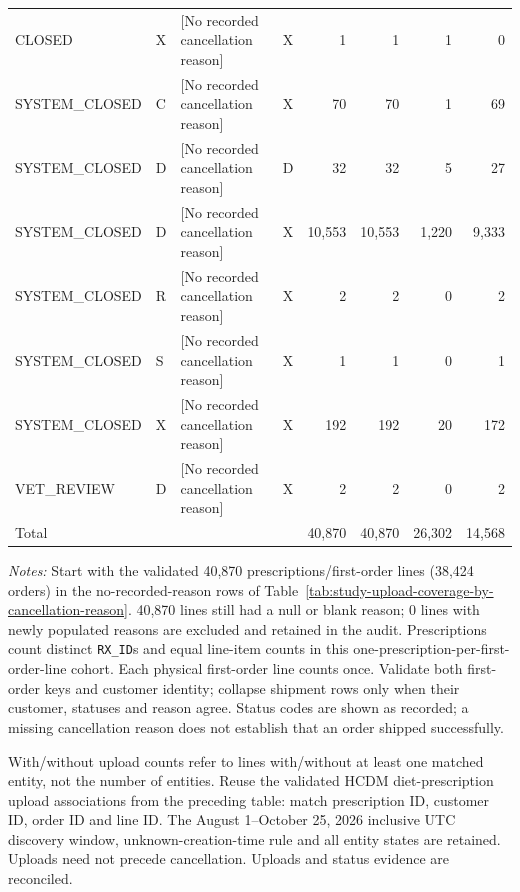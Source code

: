 \begin{landscape}
\begin{table}[htbp]
\begin{tabular}{llllrrrr}
CLOSED & X & [No recorded cancellation reason] & X & 1 & 1 & 1 & 0 \\

SYSTEM\_CLOSED & C & [No recorded cancellation reason] & X & 70 & 70 & 1 & 69 \\

SYSTEM\_CLOSED & D & [No recorded cancellation reason] & D & 32 & 32 & 5 & 27 \\

SYSTEM\_CLOSED & D & [No recorded cancellation reason] & X & 10,553 & 10,553 & 1,220 & 9,333 \\

SYSTEM\_CLOSED & R & [No recorded cancellation reason] & X & 2 & 2 & 0 & 2 \\

SYSTEM\_CLOSED & S & [No recorded cancellation reason] & X & 1 & 1 & 0 & 1 \\

SYSTEM\_CLOSED & X & [No recorded cancellation reason] & X & 192 & 192 & 20 & 172 \\

VET\_REVIEW & D & [No recorded cancellation reason] & X & 2 & 2 & 0 & 2 \\
\midrule
\multicolumn{4}{l}{Total} & 40,870 & 40,870 & 26,302 & 14,568 \\
\bottomrule
\end{tabular}
\begin{minipage}{\linewidth}
\footnotesize
\textit{Notes:} Start with the validated 40,870 prescriptions/first-order lines
(38,424 orders) in the no-recorded-reason rows of
Table~\ref{tab:study-upload-coverage-by-cancellation-reason}.
40,870 lines still had a null or blank reason;
0 lines with newly populated reasons are excluded and retained in the audit.
Prescriptions count distinct \texttt{RX\_ID}s and equal line-item counts in this
one-prescription-per-first-order-line cohort. Each physical first-order line
counts once. Validate both first-order keys and
customer identity; collapse shipment rows only when their customer, statuses and
reason agree. Status codes are shown as recorded; a missing cancellation reason
does not establish that an order shipped successfully.

With/without upload counts refer to lines with/without at least one matched
entity, not the number of entities. Reuse the validated HCDM diet-prescription
upload associations from the preceding table: match prescription ID, customer ID,
order ID and line ID. The August 1--October 25, 2026 inclusive UTC discovery window,
unknown-creation-time rule and all entity states are retained. Uploads need not
precede cancellation. Uploads and status evidence are reconciled.
\end{minipage}
\end{table}
\end{landscape}


